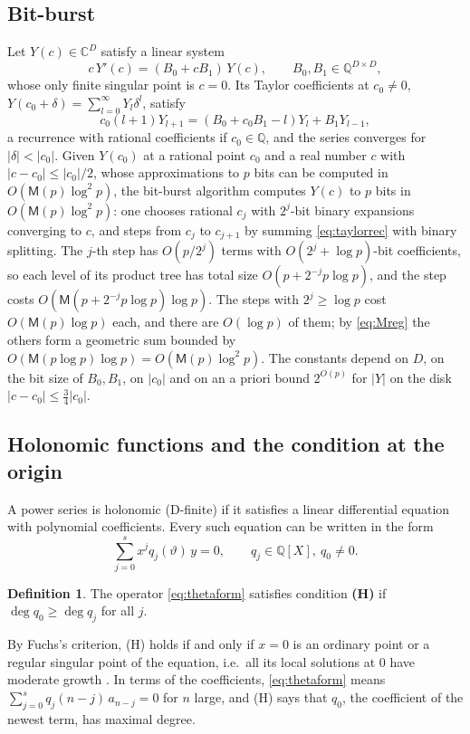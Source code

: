 \documentclass[11pt]{amsart}
\theoremstyle{definition}
\newtheorem{definition}[theorem]{Definition}
\theoremstyle{remark}
\newcommand{\QQ}{\mathbb{Q}}
\newcommand{\CC}{\mathbb{C}}
\newcommand{\Mul}{\mathsf{M}}
\begin{document}
\subsection{Bit-burst}\label{sec:bitburst} Let $Y(c) \in \CC^D$ satisfy a linear system
\begin{equation}\label{eq:fuchsys}
  c\, Y'(c) = (B_0 + c B_1)\, Y(c), \qquad B_0, B_1 \in \QQ^{D \times D},
\end{equation}
whose only finite singular point is $c = 0$. Its Taylor coefficients at $c_0 \ne 0$,
$Y(c_0 + \delta) = \sum_{l=0}^{\infty} Y_l \delta^l$, satisfy
\begin{equation}\label{eq:taylorrec}
  c_0 (l+1) Y_{l+1} = (B_0 + c_0 B_1 - l) Y_l + B_1 Y_{l-1},
\end{equation}
a recurrence with rational coefficients if $c_0 \in \QQ$, and the series converges for $|\delta| < |c_0|$.
Given $Y(c_0)$ at a rational point $c_0$ and a real number $c$ with $|c - c_0| \le |c_0|/2$, whose
approximations to $p$ bits can be computed in $O(\Mul(p)\log^2 p)$, the bit-burst algorithm
\cite{CC90,vdH99} computes $Y(c)$ to $p$ bits in $O(\Mul(p)\log^2 p)$: one chooses rational
$c_j$ with $2^j$-bit binary expansions converging to $c$, and steps from $c_{j}$ to $c_{j+1}$ by
summing \eqref{eq:taylorrec} with binary splitting. The $j$-th step has $O(p/2^j)$ terms with
$O(2^j + \log p)$-bit coefficients, so each level of its product tree has total size $O(p + 2^{-j}p\log p)$,
and the step costs $O(\Mul(p + 2^{-j}p\log p)\log p)$. The steps with $2^j \ge \log p$ cost $O(\Mul(p)\log p)$
each, and there are $O(\log p)$ of them; by \eqref{eq:Mreg} the others form a geometric sum bounded by
$O(\Mul(p\log p)\log p) = O(\Mul(p)\log^2 p)$.
The constants depend on $D$, on the bit size of $B_0, B_1$, on $|c_0|$ and on an a priori bound
$2^{O(p)}$ for $|Y|$ on the disk $|c - c_0| \le \frac34 |c_0|$.

\subsection{Holonomic functions and the condition at the origin}
A power series is holonomic (D-finite) if it satisfies a linear differential equation with polynomial coefficients.
Every such equation can be written in the form
\begin{equation}\label{eq:thetaform}
  \sum_{j=0}^{s} x^j q_j(\vartheta)\, y = 0, \qquad q_j \in \QQ[X],\ q_0 \ne 0 .
\end{equation}
\begin{definition}
The operator \eqref{eq:thetaform} satisfies condition \textbf{(H)} if $\deg q_0 \ge \deg q_j$ for all $j$.
\end{definition}
By Fuchs's criterion, (H) holds if and only if $x = 0$ is an ordinary point or a regular singular
point of the equation, i.e.\ all its local solutions at $0$ have moderate growth \cite[\S15.3]{Inc26}.
In terms of the coefficients, \eqref{eq:thetaform} means $\sum_{j=0}^{s} q_j(n-j)\, a_{n-j} = 0$ for $n$ large,
and (H) says that $q_0$, the coefficient of the newest term, has maximal degree.
\end{document}
